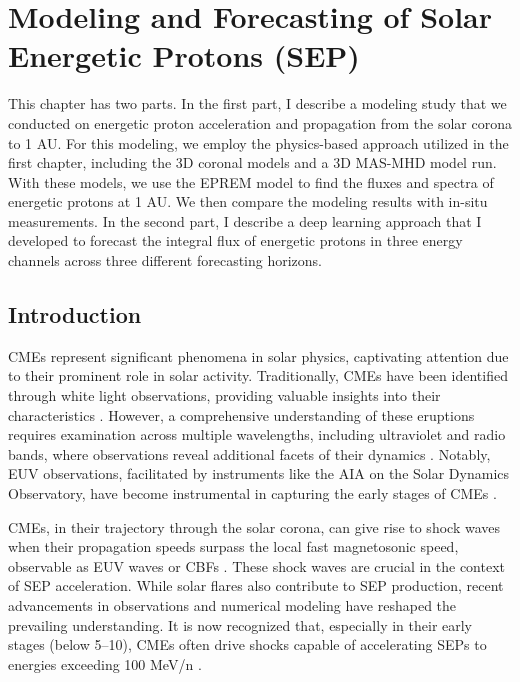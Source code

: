 \chapter{Modeling and Forecasting of Solar Energetic Protons (SEP)}
\label{chapter4}
This chapter has two parts. In the first part, I describe a modeling study that we conducted on energetic proton acceleration and propagation from the solar corona to 1 AU. For this modeling, we employ the physics-based approach utilized in the first chapter, including the 3D coronal models and a 3D MAS-MHD model run. With these models, we use the EPREM model to find the fluxes and spectra of energetic protons at 1 AU. We then compare the modeling results with in-situ measurements. In the second part, I describe a deep learning approach that I developed to forecast the integral flux of energetic protons in three energy channels across three different forecasting horizons.

\section{Introduction}
\label{sec_ch4_intro}
CMEs represent significant phenomena in solar physics, captivating attention due to their prominent role in solar activity. Traditionally, CMEs have been identified through white light observations, providing valuable insights into their characteristics \citep{vourlidas_2003, zhang_2006, bein_2011}. However, a comprehensive understanding of these eruptions requires examination across multiple wavelengths, including ultraviolet and radio bands, where observations reveal additional facets of their dynamics \citep{bastian_2001, veronig_2010}. Notably, EUV observations, facilitated by instruments like the AIA on the Solar Dynamics Observatory, have become instrumental in capturing the early stages of CMEs \citep{lemen_2012, pesnell_2012}.

CMEs, in their trajectory through the solar corona, can give rise to shock waves when their propagation speeds surpass the local fast magnetosonic speed, observable as EUV waves or CBFs \citep{thompson_1998, long_2011}. These shock waves are crucial in the context of SEP acceleration. While solar flares also contribute to SEP production, recent advancements in observations and numerical modeling have reshaped the prevailing understanding. It is now recognized that, especially in their early stages (below 5–10\rsun), CMEs often drive shocks capable of accelerating SEPs to energies exceeding 100 MeV/n \citep{ontiveross_2009, gopalswamy_2011, battarbee_2013, kozarev_2013, schwadron_2014, kong_2017}.

